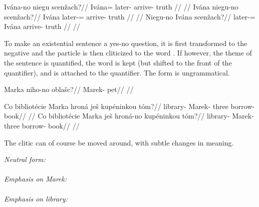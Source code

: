 \pex
\a
\begingl
\gla Iv\'ana-no niegu scen\v{z}ach?//
\glb Iv\'ana= later- arrive- truth //
\glft {}//
\endgl
\a
\begingl
\gla Iv\'ana niegu-no scen\v{z}ach?//
\glb Iv\'ana later-= arrive- truth //
\glft {}//
\endgl
\a
\begingl
\gla Niegu-no Iv\'ana scen\v{z}ach?//
\glb later-= Iv\'ana arrive- truth //
\glft {}//
\endgl
\xe

To make an existential sentence a yes-no question, it is first transformed to the negative and the particle  is then cliticized to the word . If however, the theme of the sentence is quantified, the word  is kept (but shifted to the front of the quantifier), and  is attached to the quantifier. The form  is ungrammatical.

\pex
\begingl
\gla Marka niho-no obla\v{s}c?//
\glb Marek-  pet//
\glft {}//
\endgl
\xe

\pex
\a
\begingl
\gla Co bibliot\'ecie Marka hron\'a je\v{s} kup\'eninkou t\'om?//
\glb {} library- Marek- three  borrow- book//
\glft {}//
\endgl
\a
\begingl
\gla Co bibliot\'ecie Marka je\v{s} hron\'a-no kup\'eninkou t\'om?//
\glb {} library- Marek-  three borrow- book//
\glft {}//
\endgl
\xe

The clitic  can of course be moved around, with subtle changes in meaning.

\pex
\a \emph{Neutral form:}\\
\\
\a \emph{Emphasis on \emph{Marek:}}\\
\\
\a \emph{Emphasis on \emph{library:}}\\
\\
\xe

